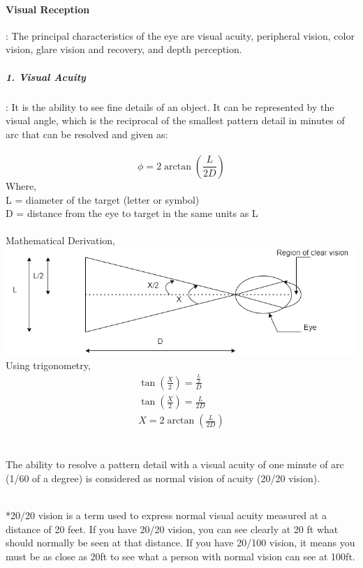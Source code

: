 \paragraph{Visual Reception}: The principal characteristics of the eye are visual acuity, peripheral vision, color vision, glare vision and recovery, and depth perception.
%
\subparagraph{1. Visual Acuity}: It is the ability to see fine details of an object. It can be represented by the visual angle, which is the reciprocal of the smallest pattern detail in minutes of arc that can be resolved and given as:
\\\\
\begin{equation}
	\phi = 2 \arctan\left(\frac{L}{2D}\right)
\end{equation}
Where,
\\
\hspace*{10mm}L = diameter of the target (letter or symbol)
\\
\hspace*{10mm}D = distance from the eye to target in the same units as L
\\\\
Mathematical Derivation,
\\
\includegraphics[scale= 0.5]{gfx/fig3.png}
\\
Using trigonometry,
\\
\begin{gather*}
	\tan\left(\frac{X}{2}\right) = \frac{\frac{L}{2}}{D}\\
	\tan\left(\frac{X}{2}\right) = \frac{L}{2D}\\
	 X = 2 \arctan\left(\frac{L}{2D}\right)
\end{gather*}
\\\\
The ability to resolve a pattern detail with a visual acuity of one minute of arc (1/60 of a degree) is considered as normal vision of acuity (20/20 vision).
\\\\
\begin{itshape}
	*20/20 vision is a term used to express normal visual acuity measured at a distance of 20 feet. If you have 20/20 vision, you can see clearly at 20 ft what should normally be seen at that distance. If you have 20/100 vision, it means you must be as close as 20ft to see what a person with normal vision can see at 100ft.
\end{itshape}
